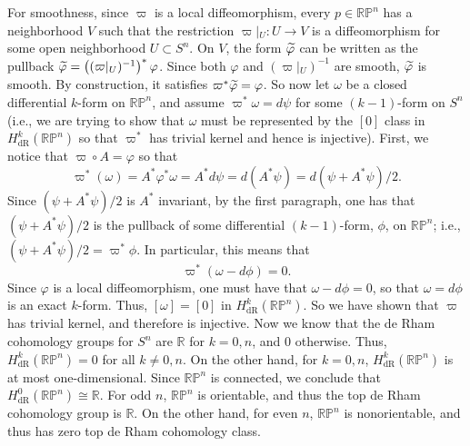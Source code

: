 \documentclass{article}
\begin{document}
{	For smoothness, since $\varpi$ is a local diffeomorphism, every $p \in \mathbb{R}\mathbb{P}^n$ has a neighborhood $V$ such that the restriction $\varpi\vert{}_U: U \to V$ is a diffeomorphism for some open neighborhood $U \subset S^n$. On $V$, the form $\widetilde{\varphi}$ can be written as the pullback $\widetilde{\varphi} = \left((\varpi\vert{}_U)^{-1}\right)^*\varphi$. Since both $\varphi$ and $(\varpi\vert{}_U)^{-1}$ are smooth, $\widetilde{\varphi}$ is smooth. By construction, it satisfies $\varpi^*\widetilde{\varphi} = \varphi$.
	} So now let $\omega$ be a closed differential $k$-form on $\mathbb{RP}^{n}$, and assume $\varpi^{\ast}\omega = d\psi$ for some $(k-1)$-form on $S^{n}$ (i.e., we are trying to show that $\omega$ must be represented by the $[0]$ class in $H^{k}_{\text{dR}}(\mathbb{RP}^{n})$ so that $\varpi^{\ast}$ has trivial kernel and hence is injective). First, we notice that $\varpi \circ A = \varphi$ so that 
	\begin{equation*}
		\varpi^{\ast}(\omega) = A^{\ast}\varphi^{\ast}\omega = A^{\ast}d\psi = d(A^{\ast}\psi) = d(\psi + A^{\ast}\psi)/2. 
	\end{equation*}
	Since $(\psi + A^{\ast}\psi)/2$ is $A^{\ast}$ invariant, by the first paragraph, one has that $(\psi + A^{\ast}\psi)/2$ is the pullback of some differential $(k - 1)$-form, $\phi$, on $\mathbb{RP}^{n}$; i.e., $(\psi + A^{\ast}\psi)/2 = \varpi^{\ast}\phi$. In particular, this means that 
	\begin{equation*}
		\varpi^{\ast}(\omega - d\phi)  = 0. 
	\end{equation*}
	Since $\varphi$ is a local diffeomorphism, one must have that $\omega - d\phi = 0$, so that $\omega = d\phi$ is an exact $k$-form. Thus, $[\omega] = [0]$ in $H^{k}_{\text{dR}}(\mathbb{RP}^{n})$. So we have shown that $\varpi$ has trivial kernel, and therefore is injective. Now we know that the de Rham cohomology groups for $S^{n}$ are $\mathbb{R}$ for $k = 0, n$, and 0 otherwise. Thus, $H^{k}_{\text{dR}}(\mathbb{RP}^{n}) = 0$ for all $k \neq 0, n$. On the other hand, for $k = 0, n$, $H^{k}_{\text{dR}}(\mathbb{RP}^{n})$ is at most one-dimensional. Since $\mathbb{RP}^{n}$ is connected, we conclude that $H^{0}_{\text{dR}}(\mathbb{RP}^{n}) \cong \mathbb{R}$. For odd $n$, $\mathbb{RP}^{n}$ is orientable, and thus the top de Rham cohomology group is $\mathbb{R}$. On the other hand, for even $n$, $\mathbb{RP}^{n}$ is nonorientable, and thus has zero top de Rham cohomology class. 
	
\end{document}
